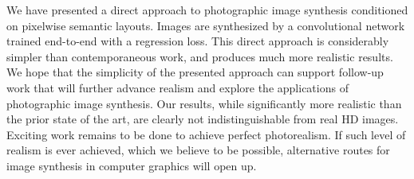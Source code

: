 We have presented a direct approach to photographic image synthesis conditioned on pixelwise semantic layouts. Images are synthesized by a convolutional network trained end-to-end with a regression loss. This direct approach is considerably simpler than contemporaneous work, and produces much more realistic results. We hope that the simplicity of the presented approach can support follow-up work that will further advance realism and explore the applications of photographic image synthesis. Our results, while significantly more realistic than the prior state of the art, are clearly not indistinguishable from real HD images. Exciting work remains to be done to achieve perfect photorealism. If such level of realism is ever achieved, which we believe to be possible, alternative routes for image synthesis in computer graphics will open up.
